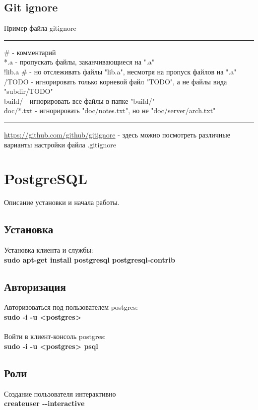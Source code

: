 \documentclass[a4paper, 12px]{article}
\begin{document}
\subsection{Git ignore}

Пример файла gitignore\\
\noindent\rule{\textwidth}{1pt}
\# - комментарий\\
*.a - пропускать файлы, заканчивающиеся на ".a"\\
!lib.a \# - но отслеживать файлы "lib.a", несмотря на пропуск файлов на ".a"\\
/TODO - игнорировать только корневой файл "TODO", а не файлы вида "subdir/TODO"\\
build/ - игнорировать все файлы в папке "build/"\\
doc/*.txt - игнорировать "doc/notes.txt", но не "doc/server/arch.txt"\\
\noindent\rule{\textwidth}{1pt}
\href{https://github.com/github/gitignore}{https://github.com/github/gitignore} - здесь можно посмотреть различные варианты настройки файла .gitignore

\section{PostgreSQL}

Описание установки и начала работы.
\subsection{Установка}

Установка клиента и службы: \\
\textbf{sudo apt-get install postgresql postgresql-contrib}

\subsection{Авторизация}

Авторизоваться под пользователем postgres: \\
\textbf{sudo -i -u <postgres>} \\\\
Войти в клиент-консоль postgres: \\
\textbf{sudo -i -u <postgres> psql}

\subsection{Роли}

Создание пользователя интерактивно \\
\textbf{createuser -\--interactive} 
\end{document}
